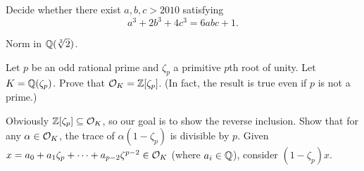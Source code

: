 \begin{problem}
	Decide whether there exist $a,b,c > 2010$ satisfying
	\[ a^3+2b^3+4c^3=6abc+1. \]
	\begin{hint}
		Norm in $\mathbb Q(\sqrt[3]2)$.
	\end{hint}
\end{problem}

\begin{dproblem}
	\twochili
	\label{prob:ring_int_cyclotomic}
	Let $p$ be an odd rational prime and $\zeta_p$ a primitive $p$th root of unity.
	Let $K = \mathbb Q(\zeta_p)$.
	Prove that $\mathcal O_K = \mathbb Z[\zeta_p]$.
	(In fact, the result is true even if $p$ is not a prime.)
	\begin{hint}
		Obviously $\mathbb Z[\zeta_p] \subseteq \mathcal O_K$, so our goal is to show the reverse inclusion.
		Show that for any $\alpha \in \mathcal O_K$, the trace of $\alpha(1-\zeta_p)$ is divisible by $p$.
		Given $x = a_0 + a_1\zeta_p + \dots + a_{p-2}\zeta^{p-2} \in \mathcal O_K$ (where $a_i \in \mathbb Q$),
		consider $(1-\zeta_p)x$.
	\end{hint}
\end{dproblem}

